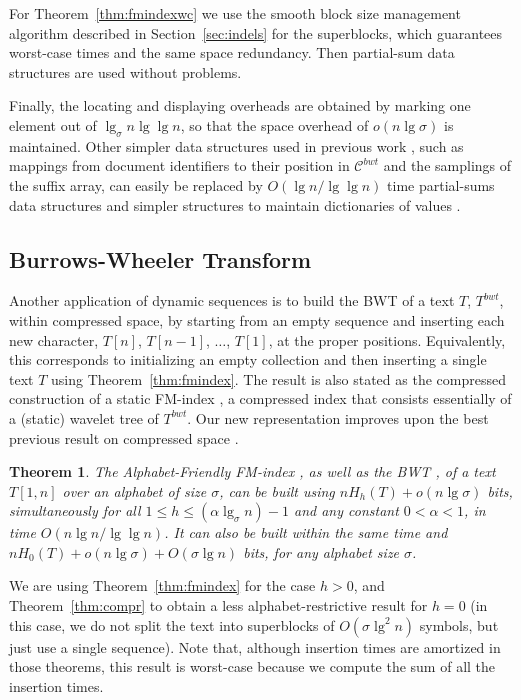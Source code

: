 \documentclass[11pt]{article}
\newtheorem{theorem}{Theorem}
\begin{document}
For Theorem~\ref{thm:fmindexwc} we use the smooth block size management
algorithm described in Section~\ref{sec:indels} for the superblocks, which 
guarantees worst-case times and the same space redundancy. Then partial-sum 
data structures are used without problems.

Finally, the locating and displaying overheads are obtained by marking one
element out of $\lg_\sigma n\lg\lg n$, so that the space overhead of 
$o(n\lg\sigma)$ is maintained. Other simpler data structures used in previous
work \cite{MN08}, such as mappings from document identifiers to their position
in $\mathcal{C}^{bwt}$ and the samplings of the suffix array, can easily be 
replaced by $O(\lg n / \lg\lg n)$ time partial-sums data structures and simpler
structures to maintain dictionaries of values \cite[Lem.~1]{NS10}.

\subsection{Burrows-Wheeler Transform} 

Another application
of dynamic sequences is to build the BWT of a text $T$, $T^{bwt}$, within
compressed space, by starting from an empty sequence and inserting each new
character, $T[n]$, $T[n-1]$, $\ldots$, $T[1]$, at the proper positions. 
Equivalently, this corresponds to initializing an empty collection and then
inserting a single text $T$ using Theorem~\ref{thm:fmindex}. The
result is also stated as the compressed construction of a static FM-index
\cite{FMMN07}, a compressed index that consists essentially of a (static) 
wavelet tree of $T^{bwt}$. Our new representation improves upon the best 
previous result on compressed space \cite{NS10}.

\begin{theorem}
The Alphabet-Friendly FM-index \cite{FMMN07}, as well as the BWT \cite{BW94}, 
of a text $T[1,n]$ over an alphabet of size $\sigma$, can be built using 
$nH_h(T)+o(n\lg\sigma)$ bits, simultaneously for
all $1 \le h \le (\alpha \lg_\sigma n)-1$ and any constant $0<\alpha<1$, in time
$O(n\lg n/\lg\lg n)$. It can also be built within the same time and 
$nH_0(T)+o(n\lg\sigma)+O(\sigma\lg n)$ bits, for
any alphabet size $\sigma$.
\end{theorem}

We are using Theorem~\ref{thm:fmindex} for the case $h>0$, and 
Theorem~\ref{thm:compr} to obtain a less alphabet-restrictive result for
$h=0$ (in this case, we do not split the text into superblocks of 
$O(\sigma\lg^2 n)$ symbols, but just use a single sequence). Note that,
although insertion times are amortized in those theorems, this result is
worst-case because we compute the sum of all the insertion times.
\end{document}
